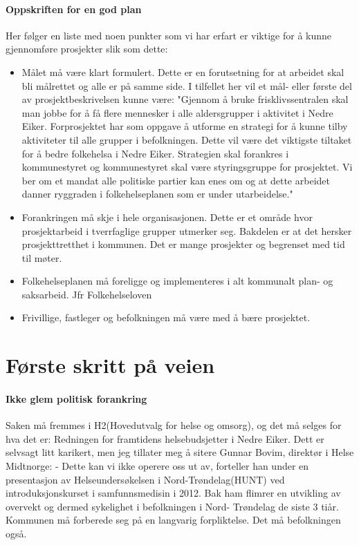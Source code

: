 \documentclass[12pt]{memoir} %
\begin{document}
		\paragraph{Oppskriften for en god plan\\}
			Her følger en liste med noen punkter som vi har erfart er viktige for å kunne gjennomføre prosjekter slik som dette:
				\begin{itemize}
					\item Målet må være klart formulert. Dette er en forutsetning for at arbeidet skal bli målrettet og alle er på samme side. I tilfellet her vil et mål- eller første del av prosjektbeskrivelsen kunne være: "Gjennom å bruke frisklivssentralen skal man jobbe for å få flere mennesker i alle aldersgrupper i aktivitet i Nedre Eiker. Forprosjektet har som oppgave å utforme en strategi for å kunne tilby aktiviteter til alle grupper i befolkningen. Dette vil være det viktigste tiltaket for å bedre folkehelsa i Nedre Eiker. Strategien skal forankres i kommunestyret og kommunestyret skal være styringsgruppe for prosjektet. Vi ber om et mandat alle politiske partier kan enes om og at dette arbeidet danner ryggraden i folkehelseplanen som er under utarbeidelse."\\
					\item Forankringen må skje i hele organisasjonen. Dette er et område hvor prosjektarbeid i tverrfaglige grupper utmerker seg. Bakdelen er at det hersker prosjekttretthet i kommunen. Det er mange prosjekter og begrenset med tid til møter.\\
					\item Folkehelseplanen må foreligge og implementeres i alt kommunalt plan- og saksarbeid. Jfr Folkehelseloven\cite{Folkehelseloven}\\
					\item Frivillige, fastleger og befolkningen må være med å bære prosjektet.\\
				\end{itemize}
	\section{Første skritt på veien}
		\paragraph{Ikke glem politisk forankring\\}
			Saken må fremmes i H2(Hovedutvalg for helse og omsorg), og det må selges for hva det er: Redningen for framtidens helsebudsjetter i Nedre Eiker. Dett er selvsagt litt karikert, men jeg tillater meg å sitere Gunnar Bovim, direktør i Helse Midtnorge: - Dette kan vi ikke operere oss ut av, forteller han under en presentasjon av Helseundersøkelsen i Nord-Trøndelag(HUNT) ved introduksjonskurset i samfunnsmedisin i 2012. Bak ham flimrer en utvikling av overvekt og dermed sykelighet i befolkningen i Nord- Trøndelag de siste 3 tiår. Kommunen må forberede seg på en langvarig forpliktelse. Det må befolkningen også.
\end{document}
